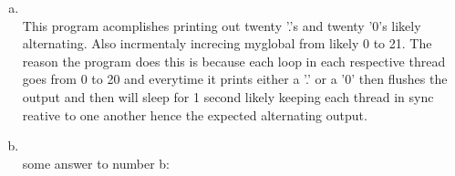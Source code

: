 \documentclass{article}
\begin{document}
\begin{enumerate}[a)]
	\item \hfill \\
	This program acomplishes printing out twenty '.'s and twenty '0's likely alternating. Also incrmentaly increcing myglobal from likely 0 to 21. The reason the program does this is because each loop in each respective thread goes from 0 to 20 and everytime it prints either a '.' or a '0' then flushes the output and then will sleep for 1 second likely keeping each thread in sync reative to one another hence the expected alternating output.
	\item \hfill \\
		some answer to number b:
\end{enumerate}
\end{document}
